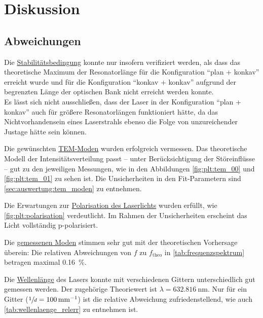 \section{Diskussion}
\label{sec:diskussion}

\subsection{Abweichungen}
    Die \hyperref[sec:auswertung:stabilitaetsbedingung]{Stabilitätsbedingung} konnte nur insofern verifiziert werden,
    als dass das theoretische Maximum der Resonatorlänge
    für die Konfiguration \enquote{plan + konkav} erreicht wurde
    und für die Konfiguration \enquote{konkav + konkav} aufgrund der begrenzten Länge der optischen Bank nicht erreicht werden konnte.\\
    Es lässt sich nicht ausschließen,
    dass der Laser in der Konfiguration \enquote{plan + konkav} auch für größere Resonatorlängen funktioniert hätte,
    da das Nichtvorhandensein eines Laserstrahls ebenso die Folge von unzureichender Justage hätte sein können.

    Die gewünschten \hyperref[sec:auswertung:tem_moden]{TEM-Moden} wurden erfolgreich vermessen.
    Das theoretische Modell der Intensitätsverteilung passt
    – unter Berücksichtigung der Störeinflüsse –
    gut zu den jeweiligen Messungen,
    wie in den Abbildungen \ref{fig:plt:tem_00} und \ref{fig:plt:tem_01} zu sehen ist.
    Die Unsicherheiten in den Fit-Parametern sind \autoref{sec:auswertung:tem_moden} zu entnehmen.

    Die Erwartungen zur \hyperref[sec:auswertung:polarisation]{Polarisation des Laserlichts} wurden erfüllt,
    wie \autoref{fig:plt:polarisation} verdeutlicht.
    Im Rahmen der Unsicherheiten erscheint das Licht vollständig p-polarisiert.


    Die \hyperref[sec:auswertung:frequenzspektrum]{gemessenen Moden} stimmen sehr gut mit der theoretischen Vorhersage überein:
    Die relativen Abweichungen von $f$ zu $f_\text{theo}$ in \autoref{tab:frequenzspektrum} betragen maximal \SI{0.16}{\percent}.

    Die \hyperref[sec:auswertung:wellenlaenge]{Wellenlänge} des Lasers konnte mit verschiedenen Gittern unterschiedlich gut gemessen werden.
    Der zugehörige Theoriewert ist $\lambda = \SI{632.816}{\nano\meter}$.
    Nur für ein Gitter ($\sfrac{1}{d} = \SI[per-mode=reciprocal]{100}{\per\milli\meter}$)
    ist die relative Abweichung zufriedenstellend,
    wie auch \autoref{tab:wellenlaenge_relerr} zu entnehmen ist.

